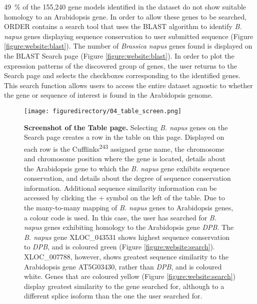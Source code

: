 \documentclass[12pt,]{book}
\begin{document}
49~\% of the 155,240 gene models identified in the dataset do not show
suitable homology to an Arabidopsis gene. In order to allow these genes
to be searched, ORDER contains a search tool that uses the BLAST
algorithm to identify \emph{B. napus} genes displaying sequence
conservation to user submitted sequence (Figure
\ref{figure:website:blast}). The number of \emph{Brassica napus} genes
found is displayed on the BLAST Search page (Figure
\ref{figure:website:blast}). In order to plot the expression patterns of
the discovered group of genes, the user returns to the Search page and
selects the checkboxes corresponding to the identified genes. This
search function allows users to access the entire dataset agnostic to
whether the gene or sequence of interest is found in the Arabidopsis
genome.

\begin{figure}[htbp]
\centering
\texttt{[image: figuredirectory/04\_table\_screen.png]}
\caption{\textbf{Screenshot of the Table page.} Selecting \emph{B.
napus} genes on the Search page creates a row in the table on this page.
Displayed on each row is the Cufflinks\textsuperscript{243} assigned
gene name, the chromosome and chromosome position where the gene is
located, details about the Arabidopsis gene to which the \emph{B. napus}
gene exhibits sequence conservation, and details about the degree of
sequence conservation information. Additional sequence similarity
information can be accessed by clicking the + symbol on the left of the
table. Due to the many-to-many mapping of \emph{B. napus} genes to
Arabidopsis genes, a colour code is used. In this case, the user has
searched for \emph{B. napus} genes exhibiting homology to the
Arabidopsis gene \emph{DPB}. The \emph{B. napus} gene XLOC\_043531 shows
highest sequence conservation to \emph{DPB}, and is coloured green
(Figure \ref{figure:website:search}). XLOC\_007788, however, shows
greatest sequence similarity to the Arabidopsis gene AT5G03430, rather
than \emph{DPB}, and is coloured white. Genes that are coloured yellow
(Figure \ref{figure:website:search}) display greatest similarity to the
gene searched for, although to a different splice isoform than the one
the user searched for.}\label{figure:website:table}
\end{figure}
\end{document}
